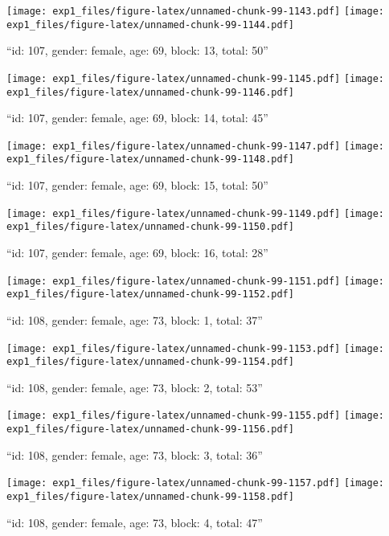 \documentclass[,]{article}
\begin{document}
\texttt{[image: exp1\_files/figure-latex/unnamed-chunk-99-1143.pdf]}
\texttt{[image: exp1\_files/figure-latex/unnamed-chunk-99-1144.pdf]}

\newpage
[1] 

``id: 107, gender: female, age: 69, block: 13, total: 50''

\texttt{[image: exp1\_files/figure-latex/unnamed-chunk-99-1145.pdf]}
\texttt{[image: exp1\_files/figure-latex/unnamed-chunk-99-1146.pdf]}

\newpage
[1] 

``id: 107, gender: female, age: 69, block: 14, total: 45''

\texttt{[image: exp1\_files/figure-latex/unnamed-chunk-99-1147.pdf]}
\texttt{[image: exp1\_files/figure-latex/unnamed-chunk-99-1148.pdf]}

\newpage
[1] 

``id: 107, gender: female, age: 69, block: 15, total: 50''

\texttt{[image: exp1\_files/figure-latex/unnamed-chunk-99-1149.pdf]}
\texttt{[image: exp1\_files/figure-latex/unnamed-chunk-99-1150.pdf]}

\newpage
[1] 

``id: 107, gender: female, age: 69, block: 16, total: 28''

\texttt{[image: exp1\_files/figure-latex/unnamed-chunk-99-1151.pdf]}
\texttt{[image: exp1\_files/figure-latex/unnamed-chunk-99-1152.pdf]}

\newpage
[1] 

``id: 108, gender: female, age: 73, block: 1, total: 37''

\texttt{[image: exp1\_files/figure-latex/unnamed-chunk-99-1153.pdf]}
\texttt{[image: exp1\_files/figure-latex/unnamed-chunk-99-1154.pdf]}

\newpage
[1] 

``id: 108, gender: female, age: 73, block: 2, total: 53''

\texttt{[image: exp1\_files/figure-latex/unnamed-chunk-99-1155.pdf]}
\texttt{[image: exp1\_files/figure-latex/unnamed-chunk-99-1156.pdf]}

\newpage
[1] 

``id: 108, gender: female, age: 73, block: 3, total: 36''

\texttt{[image: exp1\_files/figure-latex/unnamed-chunk-99-1157.pdf]}
\texttt{[image: exp1\_files/figure-latex/unnamed-chunk-99-1158.pdf]}

\newpage
[1] 

``id: 108, gender: female, age: 73, block: 4, total: 47''
\end{document}
